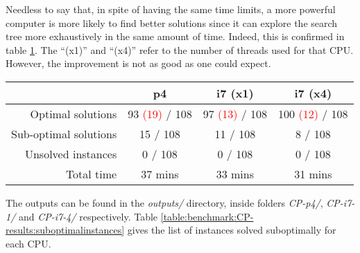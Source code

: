 \hfill

Needless to say that, in spite of having the same time limits, a more powerful computer
is more likely to find better solutions since it can explore the search tree more exhaustively
in the same amount of time. Indeed, this is confirmed in table \ref{table:benchmark:CP-results}.
The ``(x1)'' and ``(x4)'' refer to the number of threads used for that CPU. However,
the improvement is not as good as one could expect.

\begin{table}[H]
\centering
	\begin{tabular}{rccc}
								& p4			& i7 (x1)	& i7 (x4) \\
		\midrule
		Optimal solutions		& 93 \textcolor{red}{(19)} / 108
											& 97 \textcolor{red}{(13)} / 108
														& 100 \textcolor{red}{(12)} / 108 \\
		Sub-optimal solutions	& 15 / 108	& 11 / 108	&   8 / 108 \\
		Unsolved instances		&  0 / 108	&  0 / 108	&   0 / 108 \\
		Total time				& 37 mins	& 33 mins	& 31 mins \\
	\end{tabular}
	\label{table:benchmark:CP-results}
\end{table}

The outputs can be found in the \textit{outputs/} directory, inside folders
\textit{CP-p4/}, \textit{CP-i7-1/} and \textit{CP-i7-4/} respectively.
Table \ref{table:benchmark:CP-results:suboptimalinstances} gives the list of instances
solved suboptimally for each CPU.

